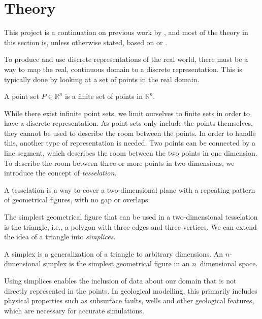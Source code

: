 \section{Theory}
\label{sec:Theory}
This project is a continuation on previous work by \textcite{UPR_thesis}, and most of the theory in this section is, unless otherwise stated, based on \textcite{UPR_thesis} or \textcite{UPR_chapter}.

To produce and use discrete representations of the real world, there must be a way to map the real, continuous domain to a discrete representation. This is typically done by looking at a set of points in the real domain.
\begin{definition}
A point set $P \in \mathbb{R}^n$ is a finite set of points in $\mathbb{R}^n$.
\end{definition}
While there exist infinite point sets, we limit ourselves to finite sets in order to have a discrete representation. As point sets only include the points themselves, they cannot be used to describe the room between the points. In order to handle this, another type of representation is needed. Two points can be connected by a line segment, which describes the room between the two points in one dimension. To describe the room between three or more points in two dimensions, we introduce the concept of \emph{tesselation}.

\begin{definition}[Tesselation]
A tesselation is a way to cover a two-dimensional plane with a repeating pattern of geometrical figures, with no gap or overlaps.
\end{definition}
The simplest geometrical figure that can be used in a two-dimensional tesselation is the triangle, i.e., a polygon with three edges and three vertices. We can extend the idea of a triangle into \emph{simplices}.


\begin{definition}[Simplex]
A simplex is a generalization of a triangle to arbitrary dimensions. An $n$-dimensional simplex is the simplest geometrical figure in an $n$~dimensional space.
\end{definition}
Using simplices enables the inclusion of data about our domain that is not directly represented in the points. In geological modelling, this primarily includes physical properties such as subsurface faults, wells and other geological features, which are necessary for accurate simulations.

